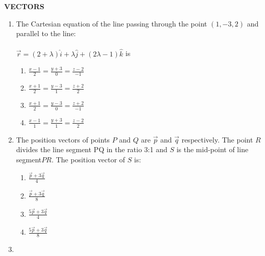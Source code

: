 \documentclass[12pt,-letter paper]{article}
\providecommand{\brak}[1]{\ensuremath{\left(#1\right)}}
\begin{document}
\begin{center}                                               \textbf{VECTORS}                                                    \end{center}                                                            \begin{enumerate}
        \item
                The Cartesian equation of the line passing through the point $\brak{1,-3,2}$ and parallel to the line:                                           \\ \\                                                                  $\overrightarrow{r} = $\brak{2+\lambda}$ \hat{i} + \lambda \hat{j}
+ $\brak{2\lambda-1}$ \hat{k}$ is
      \begin{enumerate}[label={$\brak{\Alph*}$}]                            \item  $ \frac{x-1}{2} = \frac{y+3}{0} = \frac{z-2}{-1}$                \item  $\frac{x+1}{2} = \frac{y-3}{1} = \frac{z+2}{2}$                  \item $ \frac{x+1}{2} = \frac{y-3}{0} = \frac{z+2}{-1}$                 \item  $ \frac{x-1}{1} = \frac{y+3}{1} = \frac{z-2}{2}$             \end{enumerate}                                                             \item                                                                           The position vectors of points $P$ and $ Q $ are $\overrightarrow{p}$  and $\overrightarrow{q}$ respectively. The point $ R $ divides the line segment  PQ  in the ratio 3:1  and $S$ is the mid-point of  line segment$ PR $. The position vector of $ S $ is:                                     
                \begin{enumerate}[label={$\brak{\Alph*}$}]                      \item $\frac{\overrightarrow {p} + 3\overrightarrow {q}}{4}$            \item $\frac{\overrightarrow{p} + 3\overrightarrow{q}}{8}$
        \item $\frac{5\overrightarrow{p} + 3\overrightarrow{q}}{4}$
        \item $\frac{5\overrightarrow{p} + 3\overrightarrow{q}}{8}$
    \end{enumerate}                                                          \item

\end{enumerate}
\end{document}
